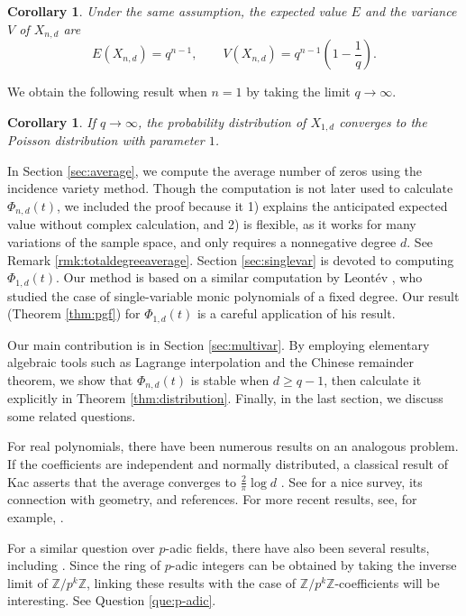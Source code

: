 \documentclass[12pt]{amsart}
\newtheorem{corollary}[theorem]{Corollary}
\theoremstyle{definition}
\newcommand{\ZZ}{\mathbb{Z} }
\begin{document}
\begin{corollary}\label{cor:meanvariance}
Under the same assumption, the expected value $E$ and the variance $V$ of $X_{n,d}$ are
\[
    E(X_{n,d}) = q^{n-1}, \qquad V(X_{n,d}) = q^{n-1}\left(1 - \frac{1}{q}\right).
\]
\end{corollary}

We obtain the following result when $n = 1$ by taking the limit $q \to \infty$. 

\begin{corollary}\label{cor:Possion}
If $q \to \infty$, the probability distribution of $X_{1,d}$ converges to the Poisson distribution with parameter $1$.
\end{corollary}

In Section \ref{sec:average}, we compute the average number of zeros using the incidence variety method. Though the computation is not later used to calculate $\Phi_{n,d}(t)$, we included the proof because it 1) explains the anticipated expected value without complex calculation, and 2) is flexible, as it works for many variations of the sample space, and only requires a nonnegative degree $d$. See Remark \ref{rmk:totaldegreeaverage}. Section \ref{sec:singlevar} is devoted to computing $\Phi_{1,d}(t)$. Our method is based on a similar computation by Leont\'ev \cite{Leo06}, who studied the case of single-variable monic polynomials of a fixed degree. Our result (Theorem \ref{thm:pgf}) for $\Phi_{1,d}(t)$ is a careful application of his result. 

Our main contribution is in Section \ref{sec:multivar}. By employing elementary algebraic tools such as Lagrange interpolation and the Chinese remainder theorem, we show that $\Phi_{n,d}(t)$ is stable when $d \ge q-1$, then calculate it explicitly in Theorem \ref{thm:distribution}. Finally, in the last section, we discuss some related questions. 

For real polynomials, there have been numerous results on an analogous problem. If the coefficients are independent and normally distributed, a classical result of Kac asserts that the average converges to $\frac{2}{\pi}\log d$ \cite{Kac43}. See \cite{EK95} for a nice survey, its connection with geometry, and references. For more recent results, see, for example, \cite{DPSZ02, NV21}. 

For a similar question over $p$-adic fields, there have also been several results, including \cite{Eva06, BCFG22}. Since the ring of $p$-adic integers can be obtained by taking the inverse limit of $\ZZ/p^k\ZZ$, linking these results with the case of $\ZZ/p^k\ZZ$-coefficients will be interesting. See Question \ref{que:p-adic}.
\end{document}
